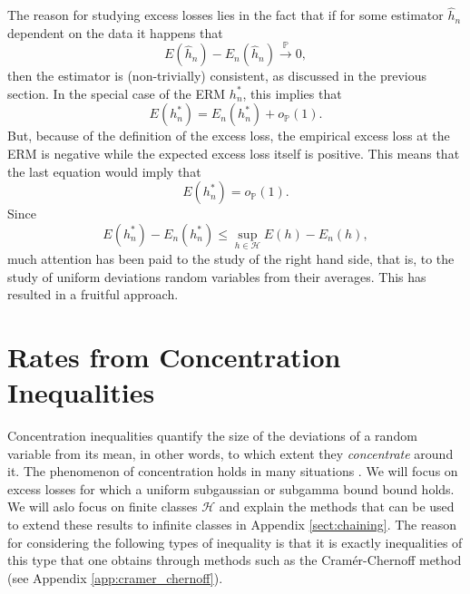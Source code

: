 \documentclass{uvamath}
\newcommand*{\calH}{\mathcal{H}}
\newcommand*{\bbP}{\mathbb{P}}
\newcommand*{\toinP}{\overset{\bbP}{\longrightarrow}}
\theoremstyle{remark}
\theoremstyle{definition}
\theoremstyle{definition}
\theoremstyle{definition}
\theoremstyle{definition}
\theoremstyle{definition}
\begin{document}
The reason for studying excess losses lies in the fact that if for
some estimator $\hat{h}_n$ dependent on the data it happens that
\begin{equation*}
  E(\hat{h}_n) - E_n(\hat{h}_n) \toinP 0,
\end{equation*}
then the estimator is (non-trivially) consistent, as discussed in the
previous section. In the special case of the ERM $h^*_n$, this implies
that
\begin{equation*}
  E(h^*_n) = E_n(h^*_n) + o_{\bbP}(1).
\end{equation*}
But, because of the definition of the excess loss, the empirical
excess loss at the ERM is negative while the expected excess loss
itself is positive. This means that the last equation would imply that
\begin{equation*}
  E(h^*_n) = o_{\bbP}(1).
\end{equation*}
Since
\begin{equation}
  E(h^*_n)-E_n(h^*_n)\leq  \sup_{h\in\calH}E(h)-E_n(h),
\end{equation}
much attention has been paid to the study of the right hand side, that
is, to the study of uniform deviations random variables from their
averages. This has resulted in a fruitful approach.


\section{Rates from Concentration
  Inequalities \label{sect:concentration_inequalities}}

Concentration inequalities quantify the size of the deviations of a
random variable from its mean, in other words, to which extent they
\textit{concentrate} around it. The phenomenon of concentration holds
in many situations \citep[see][]{boucheron_concentration_2013}. We
will focus on excess losses for which a uniform subgaussian or
subgamma bound bound holds. We will aslo focus on finite classes
$\calH$ and explain the methods that can be used to extend these
results to infinite classes in Appendix \ref{sect:chaining}. The
reason for considering the following types of inequality is that it is
exactly inequalities of this type that one obtains through methods
such as the Cramér-Chernoff method (see Appendix
\ref{app:cramer_chernoff}).
\end{document}
